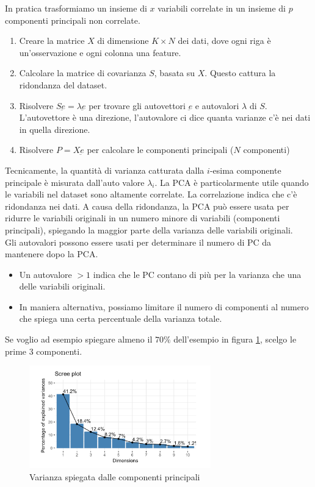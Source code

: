 In pratica trasformiamo un insieme di $x$ variabili correlate in un insieme di $p$ componenti principali non correlate.
\begin{enumerate}
	\item Creare la matrice $X$ di dimensione $K \times N$ dei dati, dove ogni riga è un'osservazione e ogni colonna una feature.
	\item Calcolare la matrice di covarianza $S$, basata su $X$. Questo cattura la ridondanza del dataset.
	\item Risolvere $S\underbar{e}=\lambda \underbar{e}$ per trovare gli autovettori $\underbar{e}$ e autovalori $\lambda$ di $S$. L'autovettore è una direzione, l'autovalore ci dice quanta varianze c'è nei dati in quella direzione.
	\item Risolvere $P=X\underbar{e}$ per calcolare le componenti principali ($N$ componenti)
\end{enumerate}
Tecnicamente, la quantità di varianza catturata dalla $i$-esima componente principale è misurata dall'auto valore $\lambda_i$.
La PCA è particolarmente utile quando le variabili nel dataset sono altamente correlate.
La correlazione indica che c'è ridondanza nei dati. A causa della ridondanza, la PCA può essere usata per ridurre le variabili originali in un numero minore di variabili (componenti principali), spiegando la maggior parte della varianza delle variabili originali.
\\
Gli autovalori possono essere usati per determinare il numero di PC da mantenere dopo la PCA.
\begin{itemize}
	\item Un autovalore $>1$ indica che le PC contano di più per la varianza che una delle variabili originali.
	\item In maniera alternativa, possiamo limitare il numero di componenti al numero che spiega una certa percentuale della varianza totale. 
\end{itemize}
Se voglio ad esempio spiegare almeno il $70\%$ dell'esempio in figura \ref{fig:pcaVarianza}, scelgo le prime 3 componenti.
\begin{figure}[H]
	\centering
	\includegraphics[width=0.7\textwidth]{pictures/pcaVarianza.png}
	\caption{Varianza spiegata dalle componenti principali}
	\label{fig:pcaVarianza}
\end{figure}
